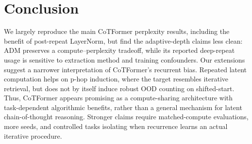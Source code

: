 \documentclass[10pt, letterpaper]{article} %
\begin{document}
\section{Conclusion}
We largely reproduce the main CoTFormer perplexity results, including the benefit of post-repeat LayerNorm, but find the adaptive-depth claims less clean: ADM preserves a compute--perplexity tradeoff, while its reported deep-repeat usage is sensitive to extraction method and training confounders. Our extensions suggest a narrower interpretation of CoTFormer’s recurrent bias. Repeated latent computation helps on p-hop induction, where the target resembles iterative retrieval, but does not by itself induce robust OOD counting on shifted-start. Thus, CoTFormer appears promising as a compute-sharing architecture with task-dependent algorithmic benefits, rather than a general mechanism for latent chain-of-thought reasoning. Stronger claims require matched-compute evaluations, more seeds, and controlled tasks isolating when recurrence learns an actual iterative procedure.

\printbibliography[heading=bibnumbered, title={References}]
\end{document}
